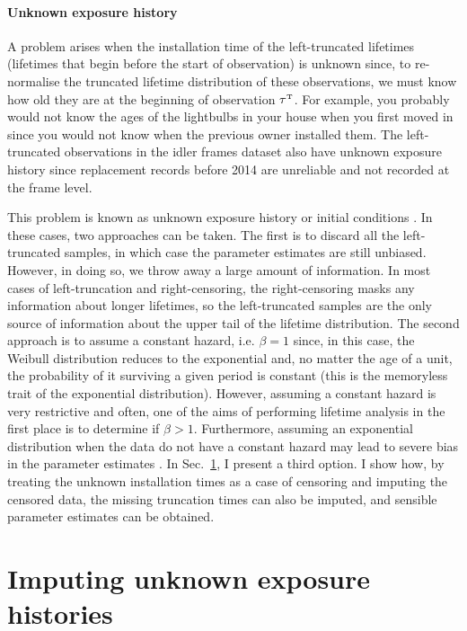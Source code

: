 \paragraph{Unknown exposure history}

A problem arises when the installation time of the left-truncated lifetimes (lifetimes that begin before the start of observation) is unknown since, to re-normalise the truncated lifetime distribution of these observations, we must know how old they are at the beginning of observation $\tau^{\hbox{\tiny{T}}}$. For example, you probably would not know the ages of the lightbulbs in your house when you first moved in since you would not know when the previous owner installed them. The left-truncated observations in the idler frames dataset also have unknown exposure history since replacement records before 2014 are unreliable and not recorded at the frame level.

This problem is known as unknown exposure history or initial conditions \citep{guo1993}. In these cases, two approaches can be taken. The first is to discard all the left-truncated samples, in which case the parameter estimates are still unbiased. However, in doing so, we throw away a large amount of information. In most cases of left-truncation and right-censoring, the right-censoring masks any information about longer lifetimes, so the left-truncated samples are the only source of information about the upper tail of the lifetime distribution. The second approach is to assume a constant hazard, i.e. $\beta = 1$ since, in this case, the Weibull distribution reduces to the exponential and, no matter the age of a unit, the probability of it surviving a given period is constant (this is the memoryless trait of the exponential distribution). However, assuming a constant hazard is very restrictive and often, one of the aims of performing lifetime analysis in the first place is to determine if $\beta > 1$. Furthermore, assuming an exponential distribution when the data do not have a constant hazard may lead to severe bias in the parameter estimates \citep{heckman1986}. In Sec.~\ref{sec:lt-imputation}, I present a third option. I show how, by treating the unknown installation times as a case of censoring and imputing the censored data, the missing truncation times can also be imputed, and sensible parameter estimates can be obtained.

\section{Imputing unknown exposure histories} \label{sec:lt-imputation}

